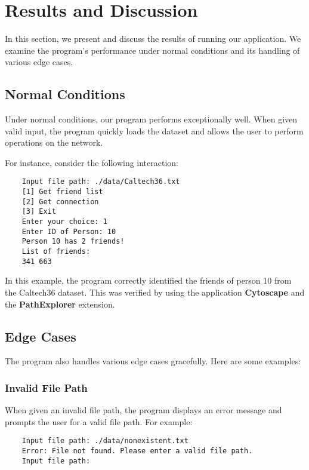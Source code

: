 \section*{Results and Discussion}

In this section, we present and discuss the results of running our application. We examine the program's performance under normal conditions and its handling of various edge cases.

\subsection*{Normal Conditions}

Under normal conditions, our program performs exceptionally well. When given valid input, the program quickly loads the dataset and allows the user to perform operations on the network.

For instance, consider the following interaction:

\begin{verbatim}
	Input file path: ./data/Caltech36.txt
	[1] Get friend list
	[2] Get connection
	[3] Exit
	Enter your choice: 1
	Enter ID of Person: 10
	Person 10 has 2 friends!
	List of friends:
	341 663
\end{verbatim}

In this example, the program correctly identified the friends of person 10 from the Caltech36 dataset. This was verified by using the application \textbf{Cytoscape} and the \textbf{PathExplorer} extension.\cite{shannon2003cytoscape}

\subsection*{Edge Cases}

The program also handles various edge cases gracefully. Here are some examples:

\subsubsection{Invalid File Path}

When given an invalid file path, the program displays an error message and prompts the user for a valid file path. For example:

\begin{verbatim}
	Input file path: ./data/nonexistent.txt
	Error: File not found. Please enter a valid file path.
	Input file path: 
\end{verbatim}

